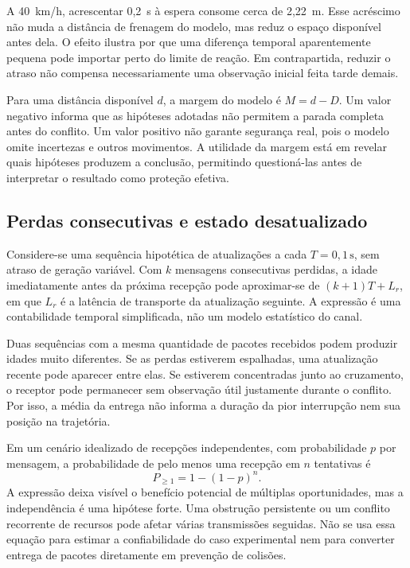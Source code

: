\documentclass[conference,a4paper]{IEEEtran}
\newcommand{\un}[1]{\,\mathrm{#1}}
\begin{document}
A 40~km/h, acrescentar 0,2~s à espera consome cerca de 2,22~m. Esse acréscimo não muda a distância de frenagem do modelo, mas reduz o espaço disponível antes dela. O efeito ilustra por que uma diferença temporal aparentemente pequena pode importar perto do limite de reação. Em contrapartida, reduzir o atraso não compensa necessariamente uma observação inicial feita tarde demais.

Para uma distância disponível $d$, a margem do modelo é $M=d-D$. Um valor negativo informa que as hipóteses adotadas não permitem a parada completa antes do conflito. Um valor positivo não garante segurança real, pois o modelo omite incertezas e outros movimentos. A utilidade da margem está em revelar quais hipóteses produzem a conclusão, permitindo questioná-las antes de interpretar o resultado como proteção efetiva.

\subsection{Perdas consecutivas e estado desatualizado}
Considere-se uma sequência hipotética de atualizações a cada $T=0{,}1\un{s}$, sem atraso de geração variável. Com $k$ mensagens consecutivas perdidas, a idade imediatamente antes da próxima recepção pode aproximar-se de $(k+1)T+L_r$, em que $L_r$ é a latência de transporte da atualização seguinte. A expressão é uma contabilidade temporal simplificada, não um modelo estatístico do canal.

Duas sequências com a mesma quantidade de pacotes recebidos podem produzir idades muito diferentes. Se as perdas estiverem espalhadas, uma atualização recente pode aparecer entre elas. Se estiverem concentradas junto ao cruzamento, o receptor pode permanecer sem observação útil justamente durante o conflito. Por isso, a média da entrega não informa a duração da pior interrupção nem sua posição na trajetória.

Em um cenário idealizado de recepções independentes, com probabilidade $p$ por mensagem, a probabilidade de pelo menos uma recepção em $n$ tentativas é
\begin{equation}
 P_{\geq 1}=1-(1-p)^n.
\end{equation}
A expressão deixa visível o benefício potencial de múltiplas oportunidades, mas a independência é uma hipótese forte. Uma obstrução persistente ou um conflito recorrente de recursos pode afetar várias transmissões seguidas. Não se usa essa equação para estimar a confiabilidade do caso experimental nem para converter entrega de pacotes diretamente em prevenção de colisões.
\end{document}
